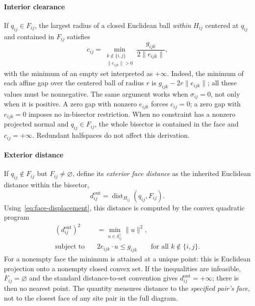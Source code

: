 \paragraph{Interior clearance}
If $q_{ij}\in F_{ij}$, the largest radius of a closed Euclidean ball \emph{within} $H_{ij}$ centered at $q_{ij}$ and contained in $F_{ij}$ satisfies
\begin{equation}
c_{ij}=
\min_{\substack{k\notin\{i,j\}\\\|e_{ijk}\|>0}}
\frac{g_{ijk}}{2\|e_{ijk}\|},
\label{eq:weak-centered-clearance}
\end{equation}
with the minimum of an empty set interpreted as $+\infty$. Indeed, the minimum of each affine gap over the centered ball of radius $r$ is $g_{ijk}-2r\|e_{ijk}\|$; all these values must be nonnegative. The same argument works when $\sigma_{ij}=0$, not only when it is positive. A zero gap with nonzero $e_{ijk}$ forces $c_{ij}=0$; a zero gap with $e_{ijk}=0$ imposes no in-bisector restriction. When no constraint has a nonzero projected normal and $q_{ij}\in F_{ij}$, the whole bisector is contained in the face and $c_{ij}=+\infty$. Redundant halfspaces do not affect this derivation.

\paragraph{Exterior distance}
If $q_{ij}\notin F_{ij}$ but $F_{ij}\ne\varnothing$, define its \emph{exterior face distance} as the inherited Euclidean distance within the bisector,
\begin{equation}
d_{ij}^{\mathrm{out}}
=\operatorname{dist}_{H_{ij}}(q_{ij},F_{ij}).
\label{eq:exterior-face-distance}
\end{equation}
Using~\eqref{eq:face-displacement}, this distance is computed by the convex quadratic program
\begin{equation}
\boxed{
\begin{aligned}
(d_{ij}^{\mathrm{out}})^2
&=\min_{u\in\delta_{ij}^{\perp}}\|u\|^2,\\
\text{subject to}\quad
&2e_{ijk}\cdot u\le g_{ijk}
\qquad\text{for all }k\notin\{i,j\}.
\end{aligned}}
\label{eq:exterior-distance-qp}
\end{equation}
For a nonempty face the minimum is attained at a unique point: this is Euclidean projection onto a nonempty closed convex set. If the inequalities are infeasible, $F_{ij}=\varnothing$ and the standard distance-to-set convention gives $d_{ij}^{\mathrm{out}}=+\infty$; there is then no nearest point. The quantity measures distance to the \emph{specified pair's face}, not to the closest face of any site pair in the full diagram.

